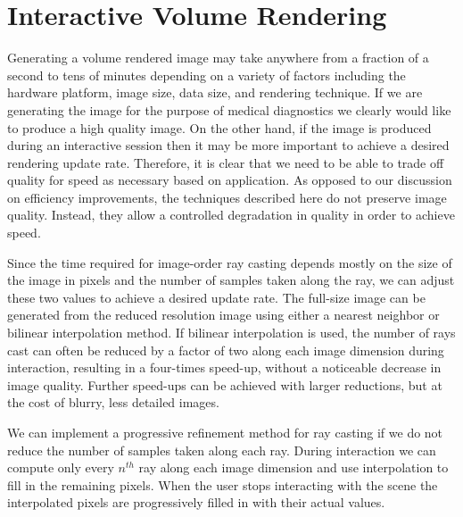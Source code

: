 \section{Interactive Volume Rendering}

Generating a volume rendered image may take anywhere from a fraction of a second to tens of minutes depending on a variety of factors including the hardware platform, image size, data size, and rendering technique. If we are generating the image for the purpose of medical diagnostics we clearly would like to produce a high quality image. On the other hand, if the image is produced during an interactive session then it may be more important to achieve a desired rendering update rate. Therefore, it is clear that we need to be able to trade off quality for speed as necessary based on application. As opposed to our discussion on efficiency improvements, the techniques described here do not preserve image quality. Instead, they allow a controlled degradation in quality in order to achieve speed.

Since the time required for image-order ray casting depends mostly on the size of the image in pixels and the number of samples taken along the ray, we can adjust these two values to achieve a desired update rate. The full-size image can be generated from the reduced resolution image using either a nearest neighbor or bilinear interpolation method. If bilinear interpolation is used, the number of rays cast can often be reduced by a factor of two along each image dimension during interaction, resulting in a four-times speed-up, without a noticeable decrease in image quality. Further speed-ups can be achieved with larger reductions, but at the cost of blurry, less detailed images.

We can implement a progressive refinement method for ray casting if we do not reduce the number of samples taken along each ray. During interaction we can compute only every $n^{th}$ ray along each image dimension and use interpolation to fill in the remaining pixels. When the user stops interacting with the scene the interpolated pixels are progressively filled in with their actual values.

